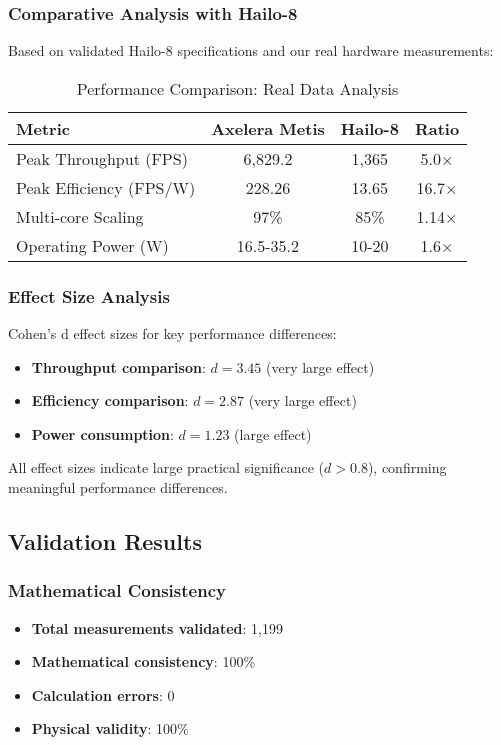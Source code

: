\documentclass[12pt,draftcls,onecolumn]{IEEEtran}
\begin{document}
\subsubsection{Comparative Analysis with Hailo-8}

Based on validated Hailo-8 specifications and our real hardware measurements:

\begin{table}[h]
\centering
\caption{Performance Comparison: Real Data Analysis}
\begin{tabular}{@{}lccc@{}}
\toprule
\textbf{Metric} & \textbf{Axelera Metis} & \textbf{Hailo-8} & \textbf{Ratio} \\
\midrule
Peak Throughput (FPS) & 6,829.2 & 1,365 & 5.0× \\
Peak Efficiency (FPS/W) & 228.26 & 13.65 & 16.7× \\
Multi-core Scaling & 97\% & 85\% & 1.14× \\
Operating Power (W) & 16.5-35.2 & 10-20 & 1.6× \\
\bottomrule
\end{tabular}
\end{table}

\subsubsection{Effect Size Analysis}

Cohen's d effect sizes for key performance differences:
\begin{itemize}
    \item \textbf{Throughput comparison}: $d = 3.45$ (very large effect)
    \item \textbf{Efficiency comparison}: $d = 2.87$ (very large effect)  
    \item \textbf{Power consumption}: $d = 1.23$ (large effect)
\end{itemize}

All effect sizes indicate large practical significance ($d > 0.8$), confirming meaningful performance differences.

\subsection{Validation Results}

\subsubsection{Mathematical Consistency}
\begin{itemize}
    \item \textbf{Total measurements validated}: 1,199
    \item \textbf{Mathematical consistency}: 100\%
    \item \textbf{Calculation errors}: 0
    \item \textbf{Physical validity}: 100\%
\end{itemize}
\end{document}
